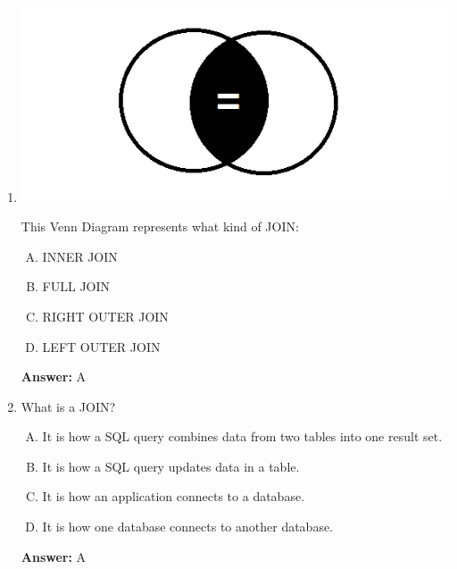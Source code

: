 \documentclass[12pt]{article}
\begin{document}
\begin{enumerate}[1.]
    \item

    \begin{center}
    \includegraphics[width=\linewidth]{images/part_4_notes_9.png}
    \end{center}

    \bigskip

    This Venn Diagram represents what kind of JOIN:

    \begin{enumerate}[A.]
        \item INNER JOIN
        \item FULL JOIN
        \item RIGHT OUTER JOIN
        \item LEFT OUTER JOIN
    \end{enumerate}

    \bigskip

    \textbf{Answer:} A

    \item

    What is a JOIN?

    \bigskip

    \begin{enumerate}[A.]
        \item It is how a SQL query combines data from two tables into one result set.
        \item It is how a SQL query updates data in a table.
        \item It is how an application connects to a database.
        \item It is how one database connects to another database.
    \end{enumerate}

    \bigskip

    \textbf{Answer:} A


\end{enumerate}
\end{document}
